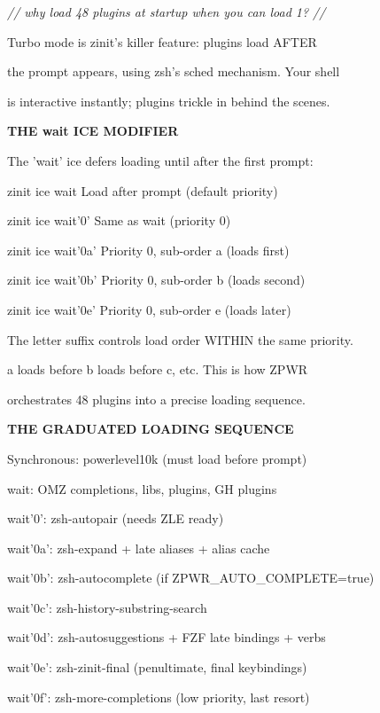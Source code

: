 \documentclass[11pt,a4paper,twoside]{book}
\begin{document}
{\small\itshape\color{dimtext} // why load 48 plugins at startup when you can load 1? //}

Turbo mode is zinit's killer feature: plugins load AFTER

the prompt appears, using zsh's sched mechanism. Your shell

is interactive instantly; plugins trickle in behind the scenes.


\vspace{12pt}
{\bfseries\color{neonyellow} THE wait ICE MODIFIER}\vspace{4pt}

The 'wait' ice defers loading until after the first prompt:

zinit ice wait            Load after prompt (default priority)

zinit ice wait'0'         Same as wait (priority 0)

zinit ice wait'0a'        Priority 0, sub-order a (loads first)

zinit ice wait'0b'        Priority 0, sub-order b (loads second)

zinit ice wait'0e'        Priority 0, sub-order e (loads later)

The letter suffix controls load order WITHIN the same priority.

a loads before b loads before c, etc. This is how ZPWR

orchestrates 48 plugins into a precise loading sequence.


\vspace{12pt}
{\bfseries\color{neonyellow} THE GRADUATED LOADING SEQUENCE}\vspace{4pt}

Synchronous:  powerlevel10k (must load before prompt)

wait:          OMZ completions, libs, plugins, GH plugins

wait'0':       zsh-autopair (needs ZLE ready)

wait'0a':      zsh-expand + late aliases + alias cache

wait'0b':      zsh-autocomplete (if ZPWR\_AUTO\_COMPLETE=true)

wait'0c':      zsh-history-substring-search

wait'0d':      zsh-autosuggestions + FZF late bindings + verbs

wait'0e':      zsh-zinit-final (penultimate, final keybindings)

wait'0f':      zsh-more-completions (low priority, last resort)
\end{document}
